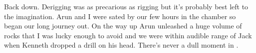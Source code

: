 Back down. Derigging was as precarious as rigging but it's probably best left to the imagination. Arun and I were sated by our few hours in the chamber so began our long journey out. On the way up Arun unleashed a huge volume of rocks that I was lucky enough to avoid and we were within audible range of Jack when Kenneth dropped a drill on his head. There's never a dull moment in .



